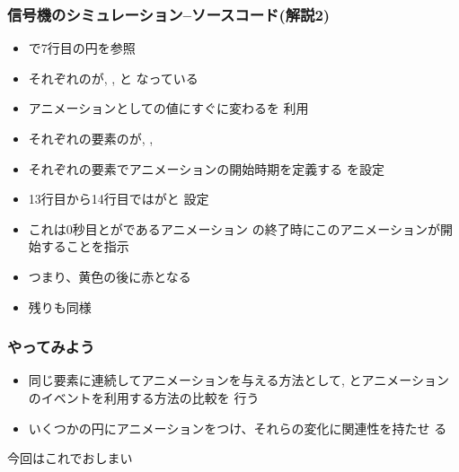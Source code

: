 \begin{frame}[containsverbatim]
\frametitle{信号機のシミュレーション--ソースコード(解説2)}
       \begin{itemize}
        \item {}で7行目の円を参照
        \item それぞれのが, , と
              なっている
        \item アニメーションとしての値にすぐに変わるを
              利用
        \item それぞれの要素のが, ,
        \item それぞれの要素でアニメーションの開始時期を定義する
              を設定
        \item 13行目から14行目ではがと
              設定
        \item これは0秒目とがであるアニメーション
              の終了時にこのアニメーションが開始することを指示
        \item つまり、黄色の後に赤となる
        \item 残りも同様
       \end{itemize}
\end{frame}
\begin{frame}[containsverbatim]
 \frametitle{やってみよう}
 \begin{itemize}
  \item 同じ要素に連続してアニメーションを与える方法として,
        とアニメーションのイベントを利用する方法の比較を
        行う
  \item いくつかの円にアニメーションをつけ、それらの変化に関連性を持たせ
        る
 \end{itemize}
 今回はこれでおしまい
\end{frame}

\begin{frame}[containsverbatim]
\frametitle{}
\end{frame}
